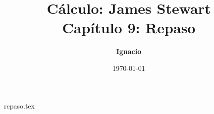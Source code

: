 \documentclass[11pt,spanish,oneside]{report}
\title{\textbf{Cálculo: James Stewart} \\ \Large Capítulo 9: Repaso}
\author{\textbf{Ignacio}}
\date{\today}
\begin{document}
\maketitle

{repaso.tex}
\end{document}
